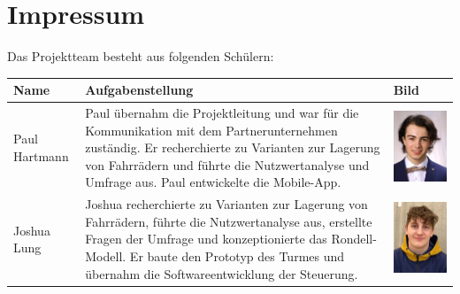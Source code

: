 \section{Impressum}
Das Projektteam besteht aus folgenden Schülern:\\

\begin{table}
    \begin{center}
    \begin{tabular}{|p{}|p{}|p{}|}
      \hline
      \textbf{Name} & \textbf{Aufgabenstellung} & \textbf{Bild} \\
      \hline
      Paul Hartmann & Paul übernahm die Projektleitung und war für die Kommunikation mit dem Partnerunternehmen zuständig. Er recherchierte zu Varianten zur Lagerung von Fahrrädern und führte die Nutzwertanalyse und Umfrage aus. Paul entwickelte die Mobile-App. & \begin{minipage}{.3\textwidth} \includegraphics{images/paulhartmann.jpg} \end{minipage}\\
      \hline
      Joshua Lung & Joshua recherchierte zu Varianten zur Lagerung von Fahrrädern, führte die Nutzwertanalyse aus, erstellte Fragen der Umfrage und konzeptionierte das Rondell-Modell. Er baute den Prototyp des Turmes und übernahm die Softwareentwicklung der Steuerung. & \begin{minipage}{.3\textwidth}\includegraphics{images/joshualung.jpg} \end{minipage}\\

\end{tabular}
\end{center}
\end{table}
